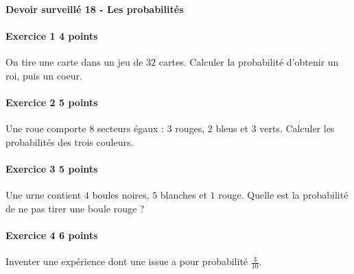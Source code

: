 \documentclass[a4paper,10pt]{article}
\newenvironment{exercice}[2]{\paragraph{Exercice #1 \hfill #2 points}\mbox{}\par}{\medskip}
\begin{document}
\begin{center}\Large\bfseries Devoir surveillé 18 - Les probabilités\end{center}
\vspace{2mm}
\begin{exercice}{1}{4}On tire une carte dans un jeu de $32$ cartes. Calculer la probabilité d'obtenir un roi, puis un coeur.\end{exercice}\begin{exercice}{2}{5}Une roue comporte $8$ secteurs égaux : $3$ rouges, $2$ bleus et $3$ verts. Calculer les probabilités des trois couleurs.\end{exercice}\begin{exercice}{3}{5}Une urne contient $4$ boules noires, $5$ blanches et $1$ rouge. Quelle est la probabilité de ne pas tirer une boule rouge ?\end{exercice}\begin{exercice}{4}{6}Inventer une expérience dont une issue a pour probabilité $\frac{3}{10}$.\end{exercice}
\end{document}
